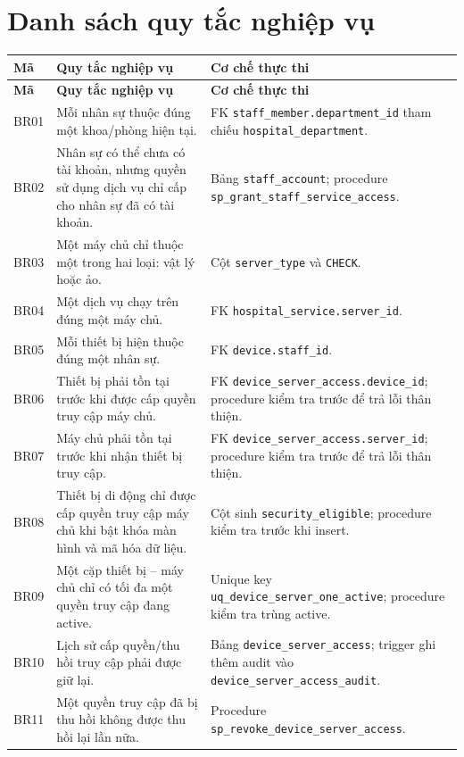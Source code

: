 \documentclass[12pt, a4paper, oneside, openany]{report}
\newcommand{\dbid}[1]{{\normalfont\ttfamily\footnotesize\nolinkurl{#1}}}
\begin{document}
\section{Danh sách quy tắc nghiệp vụ}

\begin{longtable}{|L{1.4cm}|L{6.3cm}|L{5.8cm}|}
\hline
\textbf{Mã} & \textbf{Quy tắc nghiệp vụ} & \textbf{Cơ chế thực thi} \\
\hline
\endfirsthead
\hline
\textbf{Mã} & \textbf{Quy tắc nghiệp vụ} & \textbf{Cơ chế thực thi} \\
\hline
\endhead
BR01 & Mỗi nhân sự thuộc đúng một khoa/phòng hiện tại. & FK \dbid{staff_member.department_id} tham chiếu \dbid{hospital_department}. \\
\hline
BR02 & Nhân sự có thể chưa có tài khoản, nhưng quyền sử dụng dịch vụ chỉ cấp cho nhân sự đã có tài khoản. & Bảng \dbid{staff_account}; procedure \dbid{sp_grant_staff_service_access}. \\
\hline
BR03 & Một máy chủ chỉ thuộc một trong hai loại: vật lý hoặc ảo. & Cột \dbid{server_type} và \texttt{CHECK}. \\
\hline
BR04 & Một dịch vụ chạy trên đúng một máy chủ. & FK \dbid{hospital_service.server_id}. \\
\hline
BR05 & Mỗi thiết bị hiện thuộc đúng một nhân sự. & FK \dbid{device.staff_id}. \\
\hline
BR06 & Thiết bị phải tồn tại trước khi được cấp quyền truy cập máy chủ. & FK \dbid{device_server_access.device_id}; procedure kiểm tra trước để trả lỗi thân thiện. \\
\hline
BR07 & Máy chủ phải tồn tại trước khi nhận thiết bị truy cập. & FK \dbid{device_server_access.server_id}; procedure kiểm tra trước để trả lỗi thân thiện. \\
\hline
BR08 & Thiết bị di động chỉ được cấp quyền truy cập máy chủ khi bật khóa màn hình và mã hóa dữ liệu. & Cột sinh \dbid{security_eligible}; procedure kiểm tra trước khi insert. \\
\hline
BR09 & Một cặp thiết bị -- máy chủ chỉ có tối đa một quyền truy cập đang active. & Unique key \dbid{uq_device_server_one_active}; procedure kiểm tra trùng active. \\
\hline
BR10 & Lịch sử cấp quyền/thu hồi truy cập phải được giữ lại. & Bảng \dbid{device_server_access}; trigger ghi thêm audit vào \dbid{device_server_access_audit}. \\
\hline
BR11 & Một quyền truy cập đã bị thu hồi không được thu hồi lại lần nữa. & Procedure \dbid{sp_revoke_device_server_access}. \\

\end{longtable}
\end{document}
